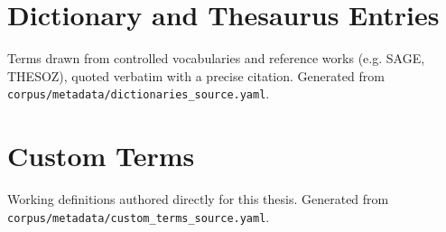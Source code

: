 \section{Dictionary and Thesaurus Entries}

Terms drawn from controlled vocabularies and reference works (e.g. SAGE,
THESOZ), quoted verbatim with a precise citation. Generated from
\texttt{corpus/metadata/dictionaries\_source.yaml}.



\section{Custom Terms}

Working definitions authored directly for this thesis. Generated from
\texttt{corpus/metadata/custom\_terms\_source.yaml}.


